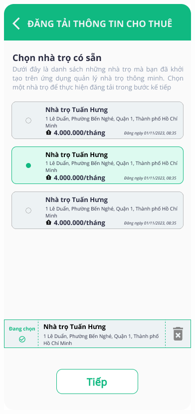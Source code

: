 \begin{figure}[!htb]
\begin{minipage}{0.32\textwidth}
     \includegraphics[width=1\linewidth]{Images/UI figma/Upload Rooming House 1.png}

\end{minipage}
\end{figure}
